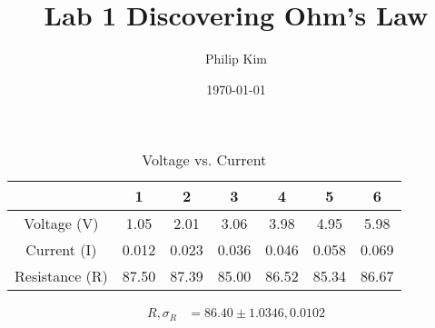 \documentclass[a4paper]{article}
\title{Lab 1 Discovering Ohm's Law}
\author{Philip Kim}
\date{\today}
\begin{document}
\maketitle
\begin{table}[h!]
  \begin{center}
    \caption{Voltage vs. Current}\label{tab:table1}
    \begin{tabular}{|c|c|c|c|c|c|c|}\hline
      & 1 & 2 & 3 & 4 & 5 & 6 \\ \hline
      Voltage (V) & 1.05 & 2.01 & 3.06 & 3.98 & 4.95 & 5.98 \\ \hline
      Current (I) & 0.012 & 0.023 & 0.036 & 0.046 & 0.058 & 0.069 \\ \hline
      Resistance (R) & 87.50 & 87.39 & 85.00 & 86.52 & 85.34 & 86.67 \\ \hline
    \end{tabular}
  \end{center}
  \begin{center}
    \begin{equation}
      \begin{split}
        R, \sigma_R &= \boxed{86.40 \pm 1.0346,0.0102}
      \end{split}
    \end{equation}
  \end{center}
\end{table}
\end{document}
